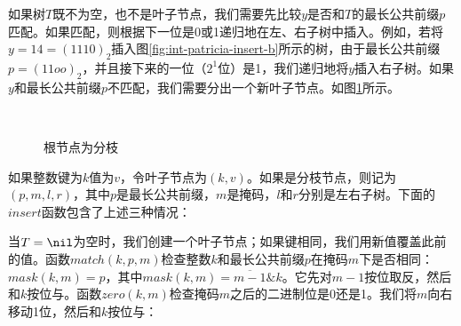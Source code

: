 \documentclass[b5paper]{ctexart}
\begin{document}
如果树$T$既不为空，也不是叶子节点，我们需要先比较$y$是否和$T$的最长公共前缀$p$匹配。如果匹配，则根据下一位是0或1递归地在左、右子树中插入。例如，若将$y = 14 = (1110)_2$插入图\ref{fig:int-patricia-insert-b}所示的树，由于最长公共前缀$p = (11oo)_2$，并且接下来的一位（$2^1$位）是1，我们递归地将$y$插入右子树。如果$y$和最长公共前缀$p$不匹配，我们需要分出一个新叶子节点。如图\ref{fig:int-patricia-insert-c}所示。

\begin{figure}[htbp]
  \centering
  \\
  \caption{根节点为分枝}
  \label{fig:int-patricia-insert-c}
\end{figure}

如果整数键为$k$值为$v$，令叶子节点为$(k, v)$。如果是分枝节点，则记为$(p, m, l, r)$，其中$p$是最长公共前缀，$m$是掩码，$l$和$r$分别是左右子树。下面的$insert$函数包含了上述三种情况：

\be
{}
\ee

当$T = \nil$为空时，我们创建一个叶子节点；如果键相同，我们用新值覆盖此前的值。函数$match(k, p, m)$检查整数$k$和最长公共前缀$p$在掩码$m$下是否相同：$mask(k, m) = p$，其中$mask(k, m) = \overline{m-1} \& k$。它先对$m - 1$按位取反，然后和$k$按位与。函数$zero(k, m)$检查掩码$m$之后的二进制位是0还是1。我们将$m$向右移动1位，然后和$k$按位与：
\end{document}

